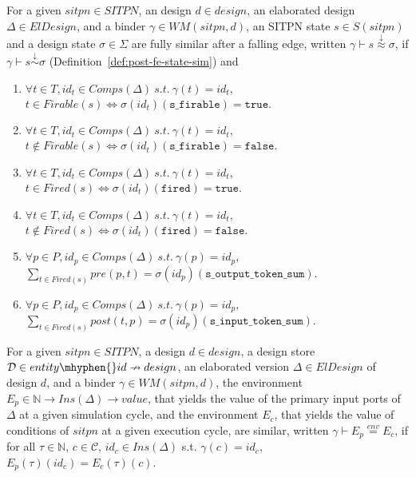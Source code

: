 \documentclass[dvipsnames,12pt]{article}
\begin{document}
\begin{definition}
  \label{def:full-post-fe-state-sim}
  For a given $sitpn\in{}SITPN$, an \hvhdl{} design $d\in{}design$, an
  elaborated design $\Delta\in{}ElDesign$, and a binder
  $\gamma\in{}WM(sitpn,d)$, an SITPN state $s\in{}S(sitpn)$ and a
  design state $\sigma\in\Sigma$ are fully similar after a falling
  edge, written $\gamma\vdash{}s\stackrel{\downarrow}{\approx}\sigma$,
  if $\gamma\vdash{}s\stackrel{\downarrow}{\sim}\sigma$
  (Definition~\ref{def:post-fe-state-sim}) and
  \begin{enumerate}
  \item $\forall{}t\in{}T,id_t\in{}Comps(\Delta)~s.t.~\gamma(t)=id_t,$
    $t\in{}Firable(s)\Leftrightarrow\sigma(id_t)(\texttt{s\_firable})=\mathtt{true}$.
  \item $\forall{}t\in{}T,id_t\in{}Comps(\Delta)~s.t.~\gamma(t)=id_t,$
    $t\notin{}Firable(s)\Leftrightarrow\sigma(id_t)(\texttt{s\_firable})=\mathtt{false}$.
  \item $\forall{}t\in{}T,id_t\in{}Comps(\Delta)~s.t.~\gamma(t)=id_t,$
    $t\in{}Fired(s)\Leftrightarrow\sigma(id_t)(\texttt{fired})=\mathtt{true}$.
  \item $\forall{}t\in{}T,id_t\in{}Comps(\Delta)~s.t.~\gamma(t)=id_t,$
    $t\notin{}Fired(s)\Leftrightarrow\sigma(id_t)(\texttt{fired})=\mathtt{false}$.
  \item $\forall{}p\in{}P,id_p\in{}Comps(\Delta)~s.t.~\gamma(p)=id_p,$
    $\sum\limits_{t\in{}Fired(s)}pre(p,t)=\sigma(id_p)(\texttt{s\_output\_token\_sum})$.
  \item $\forall{}p\in{}P,id_p\in{}Comps(\Delta)~s.t.~\gamma(p)=id_p,$
    $\sum\limits_{t\in{}Fired(s)}post(t,p)=\sigma(id_p)(\texttt{s\_input\_token\_sum})$.
  \end{enumerate}
\end{definition}

\begin{definition}
  \label{def:sim-env}
  For a given $sitpn\in{}SITPN$, a \hvhdl{} design $d\in{}design$, a
  design store
  $\mathcal{D}\in{}entity\mhyphen{}id\nrightarrow{}design$, an
  elaborated version $\Delta\in{}ElDesign$ of design $d$, and a binder
  $\gamma\in{}WM(sitpn,d)$, the environment
  $E_p\in{}\mathbb{N}\rightarrow{}Ins(\Delta)\rightarrow{}value$, that
  yields the value of the primary input ports of $\Delta$ at a given
  simulation cycle, and the environment $E_c$, that yields the value
  of conditions of $sitpn$ at a given execution cycle, are similar,
  written $\gamma\vdash{}E_p\stackrel{env}{=}E_c$, if for all
  $\tau\in{}\mathbb{N}$, $c\in\mathcal{C}$, $id_c\in{}Ins(\Delta)$
  s.t.  $\gamma(c)=id_c$, $E_p(\tau)(id_c)=E_c(\tau)(c)$.
\end{definition}
\end{document}
